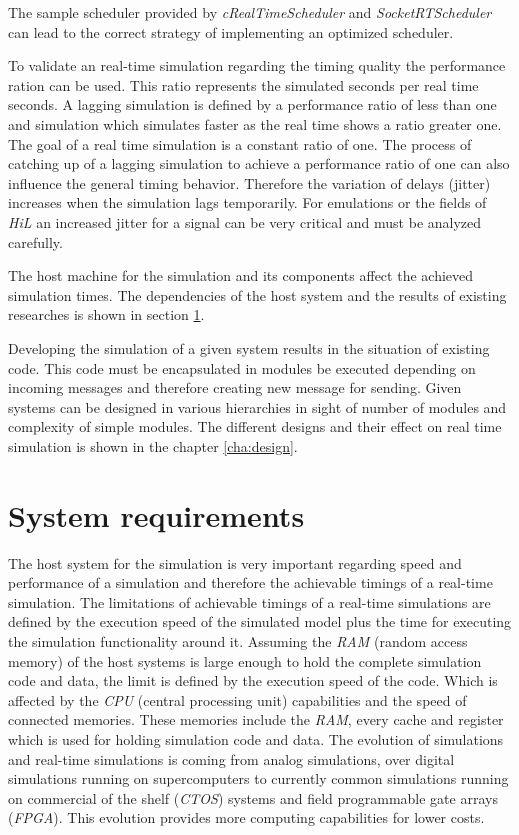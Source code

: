 The sample scheduler provided by \emph{cRealTimeScheduler} and \emph{SocketRTScheduler} can lead to the correct strategy of implementing an optimized scheduler.

To validate an real-time simulation regarding the timing quality the performance ration can be used.
This ratio represents the simulated seconds per real time seconds.
A lagging simulation is defined by a performance ratio of less than one and simulation which simulates faster as the real time shows a ratio greater one.
The goal of a real time simulation is a constant ratio of one.
The process of catching up of a lagging simulation to achieve a performance ratio of one can also influence the general timing behavior.
Therefore the variation of delays (jitter) increases when the simulation lags temporarily.
For emulations or the fields of \emph{HiL} an increased jitter for a signal can be very critical and must be analyzed carefully.

The host machine for the simulation and its components affect the achieved simulation times.
The dependencies of the host system and the results of existing researches is shown in section \ref{sec:simulation_requirements}.

Developing the simulation of a given system results in the situation of existing code.
This code must be encapsulated in modules be executed depending on incoming messages and therefore creating new message for sending.
Given systems can be designed in various hierarchies in sight of number of modules and complexity of simple modules.
The different designs and their effect on real time simulation is shown in the chapter \ref{cha:design}.

\section{System requirements}
\label{sec:simulation_requirements}
The host system for the simulation is very important regarding speed and performance of a simulation and therefore the achievable timings of a real-time simulation.
The limitations of achievable timings of a real-time simulations are defined by the execution speed of the simulated model plus the time for executing the simulation functionality around it.
Assuming the \emph{RAM} (random access memory) of the host systems is large enough to hold the complete simulation code and data, the limit is defined by the execution speed of the code.
Which is affected by the \emph{CPU} (central processing unit) capabilities and the speed of connected memories.
These memories include the \emph{RAM}, every cache and register which is used for holding simulation code and data.
The evolution of simulations and real-time simulations is coming from analog simulations, over digital simulations running on supercomputers to currently common simulations running on commercial of the shelf (\emph{CTOS}) systems and field programmable gate arrays (\emph{FPGA}).
This evolution provides more computing capabilities for lower costs. \cite[section IV]{belanger_what_2010}


